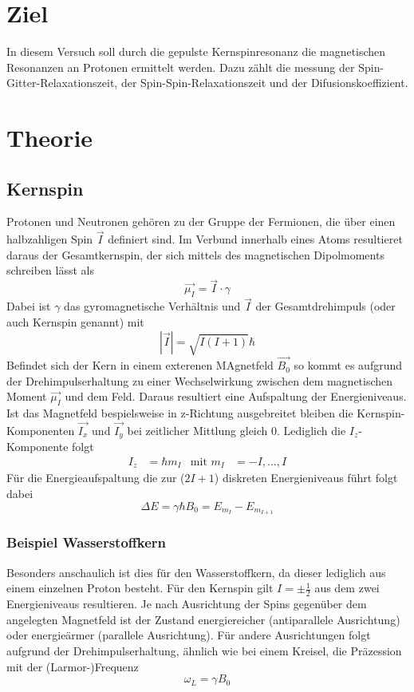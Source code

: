 \section{Ziel}
In diesem Versuch soll durch die gepulste Kernspinresonanz die magnetischen Resonanzen an Protonen ermittelt werden.
Dazu zählt die messung der Spin-Gitter-Relaxationszeit, der Spin-Spin-Relaxationszeit und der Difusionskoeffizient.

\section{Theorie}
\subsection{Kernspin}
Protonen und Neutronen gehören zu der Gruppe der Fermionen, die über einen halbzahligen Spin $\vec{I}$ definiert sind.
Im Verbund innerhalb eines Atoms resultieret daraus der Gesamtkernspin, der sich mittels des magnetischen
Dipolmoments schreiben lässt als
\begin{equation}
    \vec{\mu_I}=\vec{I}\cdot\gamma
\end{equation}
Dabei ist $\gamma$ das gyromagnetische Verhältnis und $\vec{I}$ der Gesamtdrehimpuls (oder auch Kernspin genannt) mit
\begin{equation}
    |\vec{I}|=\sqrt{I(I+1)}\hbar
\end{equation}
Befindet sich der Kern in einem exterenen MAgnetfeld $\vec{B_0}$ so kommt es aufgrund der Drehimpulserhaltung zu einer
Wechselwirkung zwischen dem magnetischen Moment $\vec{\mu_I}$ und dem Feld.
Daraus resultiert eine Aufspaltung der Energieniveaus.\\
Ist das Magnetfeld bespielsweise in z-Richtung ausgebreitet bleiben die Kernspin-Komponenten
$\vec{I_x}$ und $\vec{I_y}$ bei zeitlicher Mittlung gleich $0$. Lediglich die $I_z$-Komponente folgt
\begin{align}
    I_z&=\hbar m_I &\text{mit } m_I&=-I,...,I
\end{align} 
Für die Energieaufspaltung die zur ($2I+1$) diskreten Energieniveaus führt folgt dabei
\begin{equation}
    \Delta E=\gamma \hbar B_0=E_{m_I}-E_{m_{I+1}}
\end{equation}
\subsubsection*{Beispiel Wasserstoffkern}
Besonders anschaulich ist dies für den Wasserstoffkern, da dieser lediglich aus einem einzelnen Proton besteht.
Für den Kernspin gilt $I=\pm\frac{1}{2}$ aus dem zwei Energieniveaus resultieren.
Je nach Ausrichtung der Spins gegenüber dem angelegten Magnetfeld ist der Zustand energiereicher (antiparallele Ausrichtung)
oder energieärmer (parallele Ausrichtung). Für andere Ausrichtungen folgt aufgrund der Drehimpulserhaltung, ähnlich wie bei einem Kreisel, die
Präzession mit der (Larmor-)Frequenz 
\begin{equation}
    \omega_L=\gamma B_0
    \label{eq:lamor}
\end{equation}

